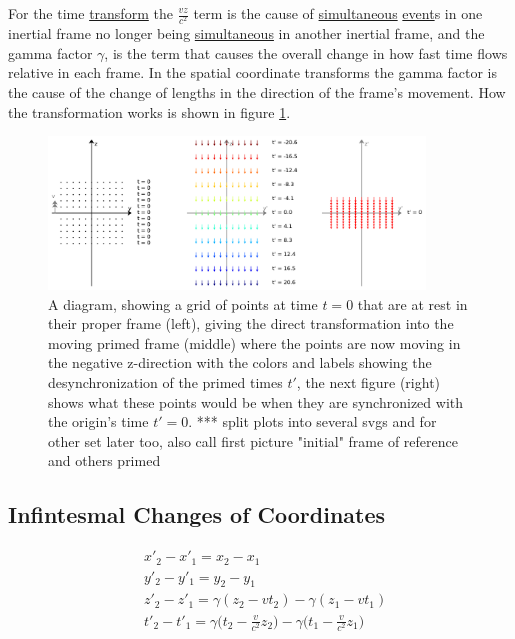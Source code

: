 For the time \hyperlink{def-transform}{transform} the $\frac{vz}{c^2}$ term is the cause of \hyperlink{def-simultaneity}{simultaneous} \hyperlink{def-event}{event}s in one inertial frame no longer being \hyperlink{def-simultaneity}{simultaneous} in another inertial frame, and the gamma factor ${\gamma}$, is the term that causes the overall change in how fast time flows relative in each frame. In the spatial coordinate transforms the gamma factor is the cause of the change of lengths in the direction of the frame's movement. How the transformation works is shown in figure \ref{fig: coordinate transform}.

\begin{figure}[H]
	\centering
	\includegraphics[width=10cm]{images/pdf/coordinate_transforms.pdf}
	\caption{A diagram, showing a grid of points at time $t=0$ that are at rest in their proper frame (left), giving the direct transformation into the moving primed frame (middle) where the points are now moving in the negative z-direction with the colors and labels showing the desynchronization of the primed times $t'$, the next figure (right) shows what these points would be when they are synchronized with the origin's time $t'=0$. *** split plots into several svgs and for other set later too, also call first picture "initial" frame of reference and others primed}
	\label{fig: coordinate transform}
\end{figure}

\subsection{Infintesmal Changes of Coordinates}

\begin{equation}
	\begin{aligned}
		 & x'_2 - x'_1 = x_2 - x_1                                                                                   \\
		 & y'_2 - y'_1 = y_2 - y_1                                                                                   \\
		 & z'_2 - z'_1 = {\gamma} ( z_2 - v t_2) - {\gamma} ( z_1 - v t_1)                                           \\
		 & t'_2 - t'_1={\gamma} \bigg( t_2-\frac{v}{c^2} z_2 \bigg) - {\gamma} \bigg( t_1 - \frac{v}{c^2} z_1 \bigg)
	\end{aligned}
\end{equation}

